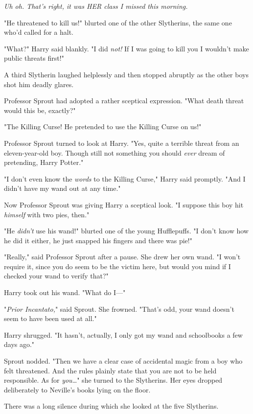 \emph{Uh oh. That's right, it was HER class I missed this morning.}

"He threatened to kill us!" blurted one of the other Slytherins, the same one 
who'd called for a halt.

"What?" Harry said blankly. "I did \emph{not!} If I was going to kill you I 
wouldn't make public threats first!"

A third Slytherin laughed helplessly and then stopped abruptly as the other 
boys shot him deadly glares.

Professor Sprout had adopted a rather sceptical expression. "What death threat 
would this be, exactly?"

"The Killing Curse! He pretended to use the Killing Curse on us!"

Professor Sprout turned to look at Harry. "Yes, quite a terrible threat from an 
eleven-year-old boy. Though still not something you should \emph{ever} dream of 
pretending, Harry Potter."

"I don't even know the \emph{words} to the Killing Curse," Harry said promptly. 
"And I didn't have my wand out at any time."

Now Professor Sprout was giving Harry a sceptical look. "I suppose this boy hit 
\emph{himself} with two pies, then."

"He \emph{didn't} use his wand!" blurted one of the young Hufflepuffs. "I don't 
know how he did it either, he just snapped his fingers and there was pie!"

"Really," said Professor Sprout after a pause. She drew her own wand. "I won't 
require it, since you do seem to be the victim here, but would you mind if I 
checked your wand to verify that?"

Harry took out his wand. "What do I---"

"\emph{Prior Incantato,}" said Sprout. She frowned. "That's odd, your wand 
doesn't seem to have been used at all."

Harry shrugged. "It hasn't, actually, I only got my wand and schoolbooks a few 
days ago."

Sprout nodded. "Then we have a clear case of accidental magic from a boy who 
felt threatened. And the rules plainly state that you are not to be held 
responsible. As for \emph{you{\ldots}}" she turned to the Slytherins. Her eyes 
dropped deliberately to Neville's books lying on the floor.

There was a long silence during which she looked at the five Slytherins.

